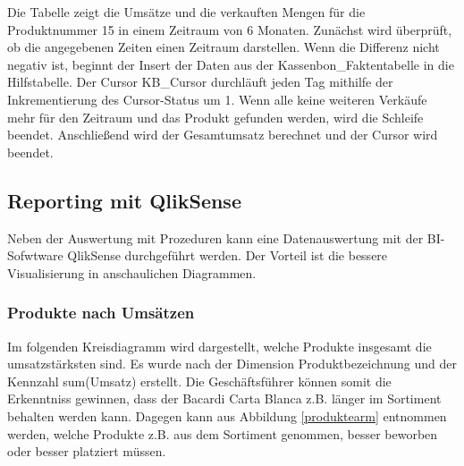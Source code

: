 Die Tabelle zeigt die Umsätze und die verkauften Mengen für die Produktnummer 15 in einem Zeitraum von 6 Monaten. Zunächst wird überprüft, ob die angegebenen Zeiten einen Zeitraum darstellen. Wenn die Differenz nicht negativ ist, beginnt der Insert der Daten aus der Kassenbon\_Faktentabelle in die Hilfstabelle. Der Cursor KB\_Cursor durchläuft jeden Tag mithilfe der Inkrementierung des Cursor-Status um 1. Wenn alle keine weiteren Verkäufe mehr für den Zeitraum und das Produkt gefunden werden, wird die Schleife beendet. Anschließend wird der Gesamtumsatz berechnet und der Cursor wird beendet.

\subsection{Reporting mit QlikSense}

Neben der Auswertung mit Prozeduren kann eine Datenauswertung mit der BI-Sofwtware QlikSense durchgeführt werden. Der Vorteil ist die bessere Visualisierung in anschaulichen Diagrammen.

\subsubsection{Produkte nach Umsätzen}

Im folgenden Kreisdiagramm wird dargestellt, welche Produkte insgesamt die umsatzstärksten sind. Es wurde nach der Dimension Produktbezeichnung und der Kennzahl sum(Umsatz) erstellt. Die Geschäftsführer können somit die Erkenntniss gewinnen, dass der Bacardi Carta Blanca z.B. länger im Sortiment behalten werden kann. Dagegen kann aus Abbildung \ref{produktearm} entnommen werden, welche Produkte z.B. aus dem Sortiment genommen, besser beworben oder besser platziert müssen.

